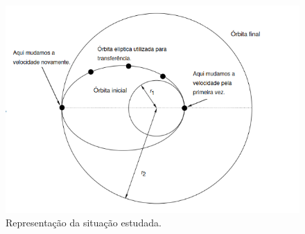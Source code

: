 \documentclass[]{IMTexam}
\begin{document}
\begin{questions}
\begin{parts}
		\begin{figure}[H]
			\centering
			\includegraphics[width=0.7\linewidth]{screenshot009}
			\caption{Representação da situação estudada.}
			\label{fig:situation}
		\end{figure}

	\end{parts}
\end{questions}
\end{document}
